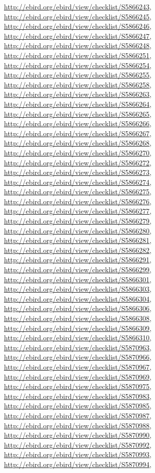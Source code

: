 \documentclass[9pt, article]{memoir}
\begin{document}
\begin{multicols}{2}
\url{http://ebird.org/ebird/view/checklist/S5866243}, 
\url{http://ebird.org/ebird/view/checklist/S5866245}, 
\url{http://ebird.org/ebird/view/checklist/S5866246}, 
\url{http://ebird.org/ebird/view/checklist/S5866247}, 
\url{http://ebird.org/ebird/view/checklist/S5866248}, 
\url{http://ebird.org/ebird/view/checklist/S5866251}, 
\url{http://ebird.org/ebird/view/checklist/S5866254}, 
\url{http://ebird.org/ebird/view/checklist/S5866255}, 
\url{http://ebird.org/ebird/view/checklist/S5866258}, 
\url{http://ebird.org/ebird/view/checklist/S5866263}, 
\url{http://ebird.org/ebird/view/checklist/S5866264}, 
\url{http://ebird.org/ebird/view/checklist/S5866265}, 
\url{http://ebird.org/ebird/view/checklist/S5866266}, 
\url{http://ebird.org/ebird/view/checklist/S5866267}, 
\url{http://ebird.org/ebird/view/checklist/S5866268}, 
\url{http://ebird.org/ebird/view/checklist/S5866270}, 
\url{http://ebird.org/ebird/view/checklist/S5866272}, 
\url{http://ebird.org/ebird/view/checklist/S5866273}, 
\url{http://ebird.org/ebird/view/checklist/S5866274}, 
\url{http://ebird.org/ebird/view/checklist/S5866275}, 
\url{http://ebird.org/ebird/view/checklist/S5866276}, 
\url{http://ebird.org/ebird/view/checklist/S5866277}, 
\url{http://ebird.org/ebird/view/checklist/S5866279}, 
\url{http://ebird.org/ebird/view/checklist/S5866280}, 
\url{http://ebird.org/ebird/view/checklist/S5866281}, 
\url{http://ebird.org/ebird/view/checklist/S5866282}, 
\url{http://ebird.org/ebird/view/checklist/S5866291}, 
\url{http://ebird.org/ebird/view/checklist/S5866299}, 
\url{http://ebird.org/ebird/view/checklist/S5866301}, 
\url{http://ebird.org/ebird/view/checklist/S5866303}, 
\url{http://ebird.org/ebird/view/checklist/S5866304}, 
\url{http://ebird.org/ebird/view/checklist/S5866306}, 
\url{http://ebird.org/ebird/view/checklist/S5866308}, 
\url{http://ebird.org/ebird/view/checklist/S5866309}, 
\url{http://ebird.org/ebird/view/checklist/S5866310}, 
\url{http://ebird.org/ebird/view/checklist/S5870963}, 
\url{http://ebird.org/ebird/view/checklist/S5870966}, 
\url{http://ebird.org/ebird/view/checklist/S5870967}, 
\url{http://ebird.org/ebird/view/checklist/S5870969}, 
\url{http://ebird.org/ebird/view/checklist/S5870975}, 
\url{http://ebird.org/ebird/view/checklist/S5870983}, 
\url{http://ebird.org/ebird/view/checklist/S5870985}, 
\url{http://ebird.org/ebird/view/checklist/S5870987}, 
\url{http://ebird.org/ebird/view/checklist/S5870988}, 
\url{http://ebird.org/ebird/view/checklist/S5870990}, 
\url{http://ebird.org/ebird/view/checklist/S5870992}, 
\url{http://ebird.org/ebird/view/checklist/S5870993}, 
\url{http://ebird.org/ebird/view/checklist/S5870994}, 

\end{multicols}
\end{document}
